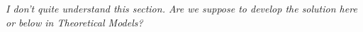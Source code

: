 \documentclass[12pt]{article}
\begin{document}
\textit{I don't quite understand this section. Are we suppose to develop the solution here or below in Theoretical Models?}




\end{document}
